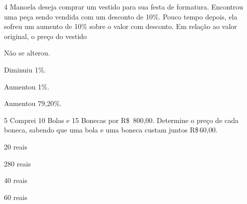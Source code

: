 \num{4} Manoela deseja comprar um vestido para sua festa de formatura.
Encontrou uma peça sendo vendida com um desconto de 10\%. Pouco tempo
depois, ela sofreu um aumento de 10\% sobre o valor com desconto. Em
relação ao valor original, o preço do vestido

\begin{escolha}
\item Não se alterou.
\item Diminuiu 1\%.
\item Aumentou 1\%.
\item Aumentou 79,20\%.
\end{escolha}









\num{5} Comprei 10 Bolas e 15 Bonecas por R\$~800,00. Determine o preço de
cada boneca, sabendo que uma bola e uma boneca custam juntos R\$\,60,00.

\begin{escolha}
\item 20 reais
\item 280 reais
\item 40 reais
\item 60 reais
\end{escolha}


